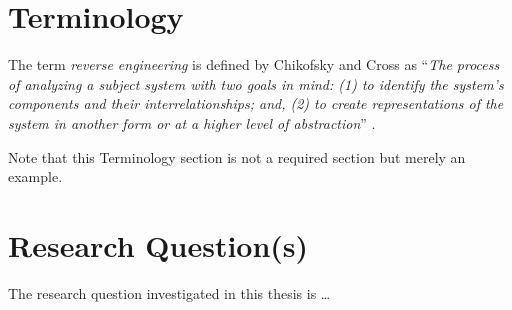 \section{Terminology}

The term \emph{reverse engineering} is defined by Chikofsky and Cross as 
``\emph{The process of analyzing a subject system with two goals in mind: 
(1) to identify the system's components and their interrelationships; and,
(2) to create representations of the system in another form or at a higher 
level of abstraction}'' \cite{c11tester}.

Note that this Terminology section is not a required section but 
merely an example.

\section{Research Question(s)}

The research question investigated in this thesis is \ldots


